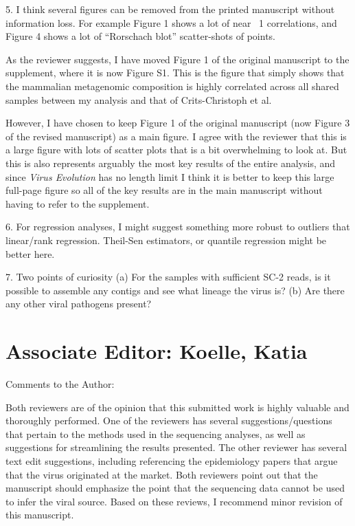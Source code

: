 \documentclass[11pt, oneside]{article}   	%
\newcommand{\response}[1]{{\color{black}#1}}
\begin{document}
5. I think several figures can be removed from the printed manuscript without information loss. For example Figure 1 shows a lot of near ~1 correlations, and Figure 4 shows a lot of ``Rorschach blot'' scatter-shots of points.

\response{
As the reviewer suggests, I have moved Figure 1 of the original manuscript to the supplement, where it is now Figure S1.
This is the figure that simply shows that the mammalian metagenomic composition is highly correlated across all shared samples between my analysis and that of Crits-Christoph et al.

However, I have chosen to keep Figure 1 of the original manuscript (now Figure 3 of the revised manuscript) as a main figure.
I agree with the reviewer that this is a large figure with lots of scatter plots that is a bit overwhelming to look at.
But this is also represents arguably the most key results of the entire analysis, and since \textit{Virus Evolution} has no length limit I think it is better to keep this large full-page figure so all of the key results are in the main manuscript without having to refer to the supplement.
}

6. For regression analyses, I might suggest something more robust to outliers that linear/rank regression. Theil-Sen estimators, or quantile regression might be better here.

7. Two points of curiosity
   (a) For the samples with sufficient SC-2 reads, is it possible to assemble any contigs and see what lineage the virus is?
   (b) Are there any other viral pathogens present?


\section*{Associate Editor: Koelle, Katia}

Comments to the Author:

Both reviewers are of the opinion that this submitted work is highly valuable and thoroughly performed. One of the reviewers has several suggestions/questions that pertain to the methods used in the sequencing analyses, as well as suggestions for streamlining the results presented. The other reviewer has several text edit suggestions, including referencing the epidemiology papers that argue that the virus originated at the market. Both reviewers point out that the manuscript should emphasize the point that the sequencing data cannot be used to infer the viral source. Based on these reviews, I recommend minor revision of this manuscript.

\color{black}

{\small

}
\end{document}

